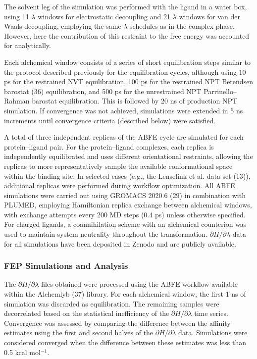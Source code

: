 The solvent leg of the simulation was performed with the ligand in a water box, using 11 $\lambda$ windows for electrostatic decoupling and 21 $\lambda$ windows for van der Waals decoupling, employing the same $\lambda$ schedules as in the complex phase. However, here the contribution of this restraint to the free energy was accounted for analytically.

Each alchemical window consists of a series of short equilibration steps similar to the protocol described previously for the equilibration cycles, although using 10 ps for the restrained NVT equilibration, 100 ps for the restrained NPT Berendsen barostat (36) equilibration, and 500 ps for the unrestrained NPT Parrinello--Rahman barostat equilibration. This is followed by 20 ns of production NPT simulation. If convergence was not achieved, simulations were extended in 5 ns increments until convergence criteria (described below) were satisfied.

A total of three independent replicas of the ABFE cycle are simulated for each protein--ligand pair. For the protein--ligand complexes, each replica is independently equilibrated and uses different orientational restraints, allowing the replicas to more representatively sample the available conformational space within the binding site. In selected cases (e.g., the Lenselink et al. data set (13)), additional replicas were performed during workflow optimization. All ABFE simulations were carried out using GROMACS 2020.6 (29) in combination with PLUMED, employing Hamiltonian replica exchange between alchemical windows, with exchange attempts every 200 MD steps (0.4 ps) unless otherwise specified. For charged ligands, a coannihilation scheme with an alchemical counterion was used to maintain system neutrality throughout the transformation. $\partial H/\partial \lambda$ data for all simulations have been deposited in Zenodo and are publicly available.

\subsubsection{FEP Simulations and Analysis}

The $\partial H/\partial \lambda$ files obtained were processed using the ABFE workflow available within the Alchemlyb (37) library. For each alchemical window, the first 1 ns of simulation was discarded as equilibration. The remaining samples were decorrelated based on the statistical inefficiency of the $\partial H/\partial \lambda$ time series. Convergence was assessed by comparing the difference between the affinity estimates using the first and second halves of the $\partial H/\partial \lambda$ data. Simulations were considered converged when the difference between these estimates was less than 0.5 kcal mol$^{-1}$.

